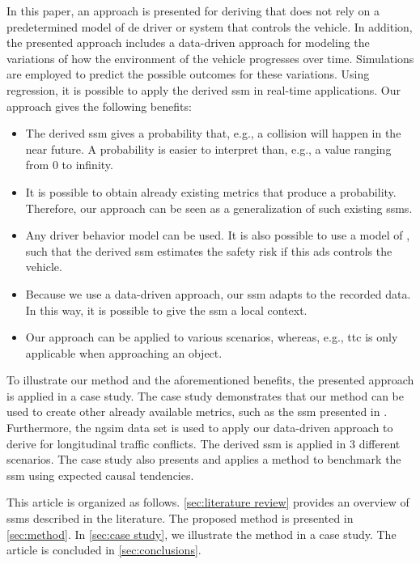 In this paper, an approach is presented for deriving  that does not rely on a predetermined model of de driver or system that controls the vehicle. 
In addition, the presented approach includes a data-driven approach for modeling the variations of how the environment of the vehicle progresses over time.
Simulations are employed to predict the possible outcomes for these variations.
Using regression, it is possible to apply the derived \ac{ssm} in real-time applications.
Our approach gives the following benefits:
\begin{itemize}
	\item The derived \ac{ssm} gives a probability that, e.g., a collision will happen in the near future. 
	A probability is easier to interpret than, e.g., a value ranging from 0 to infinity.
	
	\item It is possible to obtain already existing metrics that produce a probability. 
	Therefore, our approach can be seen as a generalization of such existing \acp{ssm}.
	
	\item Any driver behavior model can be used.
	It is also possible to use a model of , such that the derived \ac{ssm} estimates the safety risk if this \ac{ads} controls the vehicle.
	
	\item Because we use a data-driven approach, our \ac{ssm} adapts to the recorded data. 
	In this way, it is possible to give the \ac{ssm} a local context.
	
	\item Our approach can be applied to various scenarios, whereas, e.g., \ac{ttc} is only applicable when approaching an object.
\end{itemize}

To illustrate our method and the aforementioned benefits, the presented approach is applied in a case study.
The case study demonstrates that our method can be used to create other already available metrics, such as the \ac{ssm} presented in \autocite{wang2014evaluation}.
Furthermore, the \ac{ngsim} data set \autocite{kovvali2007video} is used to apply our data-driven approach to derive  for longitudinal traffic conflicts.
The derived \ac{ssm} is applied in 3 different scenarios.
The case study also presents and applies a method to benchmark the \ac{ssm} using expected causal tendencies.

This article is organized as follows.
\cref{sec:literature review} provides an overview of \acp{ssm} described in the literature.
The proposed method is presented in \cref{sec:method}.
In \cref{sec:case study}, we illustrate the method in a case study.
The article is concluded in \cref{sec:conclusions}.
